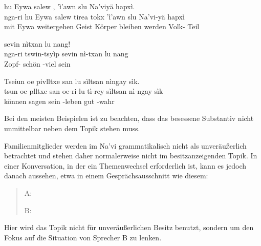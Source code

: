 \begin{interlin}
	\glll \Nfilm{} hu Eywa salew ,  'ì'awn slu Na'viyä hapxì. \\
	nga-ri hu Eywa salew tirea tokx 'ì'awn slu Na'vi-yä hapxì \\
	 mit Eywa weitergehen Geist Körper bleiben werden Volk- Teil \\
\end{interlin}

\begin{interlin}
	\glll \Npawl{}  sevin nìtxan lu nang! \\
	nga-ri tswin-tsyìp sevin nì-txan lu nang \\
	 Zopf- schön -viel sein  \\
\end{interlin}

\begin{interlin}
	\glll \Npawl{}Tseiun oe pivlltxe san  lu  sìltsan nìngay sìk. \\
	tsun oe plltxe san oe-ri lu tì-rey sìltsan nì-ngay sìk \\
	können  sagen   sein -leben gut -wahr  \\
\end{interlin}

\noindent Bei den meisten Beispielen ist zu beachten, dass das besessene Substantiv nicht unmittelbar neben dem Topik stehen muss. 

Familienmitglieder werden im Na'vi grammatikalisch nicht als unveräußerlich betrachtet und stehen daher normalerweise nicht im besitzanzeigenden Topik. In einer Konversation, in der ein Themenwechsel erforderlich ist, kann es jedoch danach aussehen, etwa in einem Gesprächsausschnitt wie diesem:

\begin{quotation}
	\noindent A: \\
	\indent{}
	
	\noindent B: \\
	\indent{}
\end{quotation}
\noindent Hier wird das Topik nicht für unveräußerlichen Besitz benutzt, sondern um den Fokus auf die Situation von Sprecher B zu lenken.

